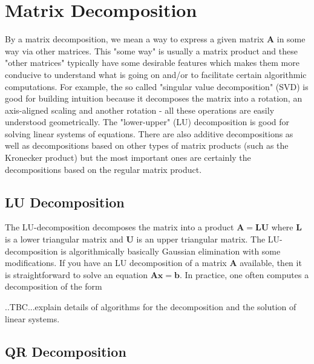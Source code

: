 \section{Matrix Decomposition}
By a matrix decomposition, we mean a way to express a given matrix $\mathbf{A}$ in some way via other matrices. This "some way" is usually a matrix product and these "other matrices" typically have some desirable features which makes them more conducive to understand what is going on and/or to facilitate certain algorithmic computations. For example, the so called "singular value decomposition" (SVD) is good for building intuition because it decomposes the matrix into a rotation, an axis-aligned scaling and another rotation - all these operations are easily understood geometrically. The "lower-upper" (LU) decomposition is good for solving linear systems of equations. There are also additive decompositions as well as decompositions based on other types of matrix products (such as the Kronecker product) but the most important ones are certainly the decompositions based on the regular matrix product.



\subsection{LU Decomposition}
The LU-decomposition decomposes the matrix into a product $\mathbf{A = L U}$ where $\mathbf{L}$ is a lower triangular matrix and $\mathbf{U}$ is an upper triangular matrix. The LU-decomposition is algorithmically basically Gaussian elimination with some modifications. If you have an LU decomposition of a matrix $\mathbf{A}$ available, then it is straightforward to solve an equation $\mathbf{Ax = b}$. In practice, one often computes a decomposition of the form 

..TBC...explain details of algorithms for the decomposition and the solution of linear systems.


\subsection{QR Decomposition}

